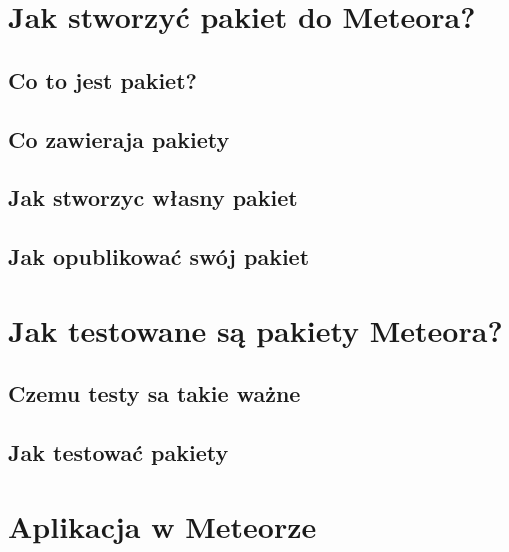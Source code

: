 \documentclass[brudnopis]{xmgr}
\begin{document}
\chapter{Jak stworzyć pakiet do Meteora?}


\section{Co to jest pakiet?}

\section{Co zawieraja pakiety}

\section{Jak stworzyc własny pakiet}

\section{Jak opublikować swój pakiet}


      
\chapter{Jak testowane są pakiety Meteora?}

\section{Czemu testy sa takie ważne}
    
\section{Jak testować pakiety}

   

\chapter{Aplikacja w Meteorze}
\end{document}
